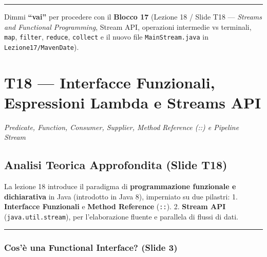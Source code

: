 \documentclass[11pt,a4paper,oneside]{report}
\newcommand{\passthrough}[1]{#1}
\begin{document}
\begin{center}\rule{0.5\linewidth}{0.5pt}\end{center}

Dimmi \textbf{``vai''} per procedere con il \textbf{Blocco 17} (Lezione
18 / Slide T18 --- \emph{Streams and Functional Programming}, Stream
API, operazioni intermedie vs terminali, \passthrough{\lstinline!map!},
\passthrough{\lstinline!filter!}, \passthrough{\lstinline!reduce!},
\passthrough{\lstinline!collect!} e il nuovo file
\passthrough{\lstinline!MainStream.java!} in
\passthrough{\lstinline!Lezione17/MavenDate!}).

\newpage
\chapter[T18 --- Interfacce Funzionali, Espressioni ]{T18 --- Interfacce Funzionali, Espressioni Lambda e Streams API}
\label{chap:t18}

{\small\sffamily\color{accentblue!80!black}\textit{Predicate, Function, Consumer, Supplier, Method Reference (::) e Pipeline Stream}}

\vspace{0.8em}

\section{Analisi Teorica Approfondita (Slide
T18)}\label{chap17_analisi-teorica-approfondita-slide-t18}

La lezione 18 introduce il paradigma di \textbf{programmazione
funzionale e dichiarativa} in Java (introdotto in Java 8), imperniato su
due pilastri: 1. \textbf{Interfacce Funzionali} e \textbf{Method
Reference} (\passthrough{\lstinline!::!}). 2. \textbf{Stream API}
(\passthrough{\lstinline!java.util.stream!}), per l'elaborazione fluente
e parallela di flussi di dati.

\begin{center}\rule{0.5\linewidth}{0.5pt}\end{center}

\subsection{Cos'è una Functional Interface? (Slide
3)}\label{chap17_cosuxe8-una-functional-interface-slide-3}
\end{document}
